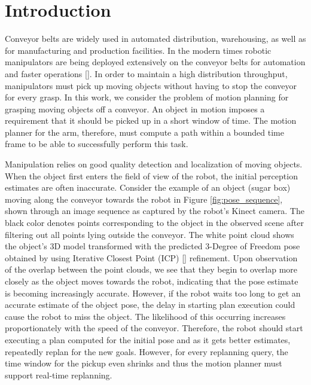 \documentclass[conference]{IEEEtran}
\begin{document}
\IEEEpeerreviewmaketitle

\section{Introduction}

Conveyor belts are widely used in automated distribution, warehousing, as well as for manufacturing and production facilities. In the modern times robotic manipulators are being deployed extensively on the conveyor belts for automation and faster operations []. In order to maintain a high distribution throughput, manipulators must pick up moving objects without having to stop the conveyor for every grasp. In this work, we consider the problem of motion planning for grasping moving objects off a conveyor. An object in motion imposes a requirement that it should be picked up in a short window of time. The motion planner for the arm, therefore, must compute a path within a bounded time frame to be able to successfully perform this task.

Manipulation relies on good quality detection and localization of moving objects. When the object first enters the field of view of the robot, the initial perception estimates are often inaccurate. Consider the example of an object (sugar box) moving along the conveyor towards the robot in Figure \ref{fig:pose_sequence}, shown through an image sequence as captured by the robot's Kinect camera. The black color denotes points corresponding to the object in the observed scene after filtering out all points lying outside the conveyor. The white point cloud shows the object's 3D model transformed with the predicted 3-Degree of Freedom pose obtained by using Iterative Closest Point (ICP) [] refinement. Upon observation of the overlap between the point clouds, we see that they begin to overlap more closely as the object moves towards the robot, indicating that the pose estimate is becoming increasingly accurate. However, if the robot waits too long to get an accurate estimate of the object pose, the delay in starting plan execution could cause the robot to miss the object. The likelihood of this occurring increases proportionately with the speed of the conveyor. Therefore, the robot should start executing a plan computed for the initial pose and as it gets better estimates, repeatedly replan for the new goals. However, for every replanning query, the time window for the pickup even shrinks and thus the motion planner must support real-time replanning.
\end{document}
